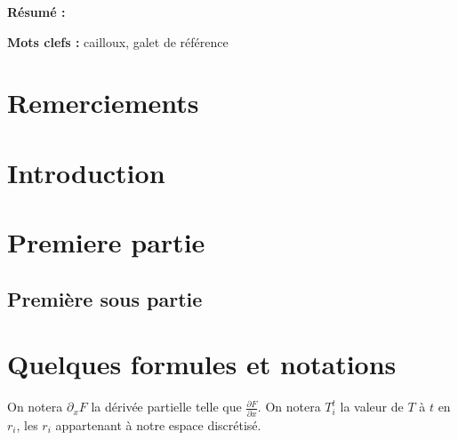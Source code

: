 \documentclass[10pt,a4paper]{article}
\numberwithin{equation}{section}
\begin{document}
\begin{titlepage}
\textbf{Résumé :} 
\vspace{0.3cm}

\textbf{Mots clefs :} cailloux, galet de référence
\vspace{0.3cm}


\end{titlepage}

\newpage

\renewcommand\thepage{}

\section*{Remerciements}




\tableofcontents


\newpage
\renewcommand\thepage{\arabic{page}}
\setcounter{page}{1}



\section*{Introduction}


\newpage
\section{Premiere partie}

\subsection{Première sous partie}



\section{Quelques formules et notations}
On notera $\partial_x F$ la dérivée partielle telle que $\frac{\partial F}{\partial x}$. On notera $T^t_i$ la valeur de $T$ à $t$ en $r_i$, les $r_i$ appartenant à notre espace discrétisé.
\end{document}
